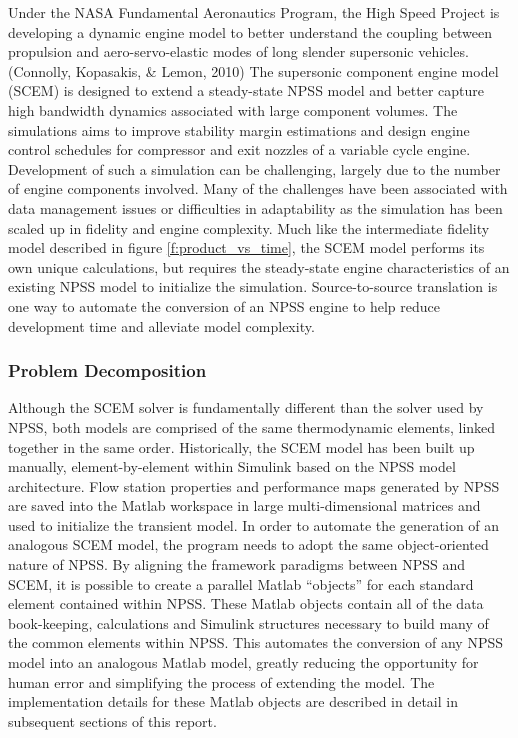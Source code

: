 \documentclass[heading.tex]{subfiles}
\begin{document}
	Under the NASA Fundamental Aeronautics Program, the High Speed Project is developing a dynamic engine model
to better understand the coupling between propulsion and  aero-servo-elastic modes of long slender
supersonic vehicles. (Connolly, Kopasakis, \& Lemon, 2010) The supersonic component engine model (SCEM) is 
designed to extend a steady-state NPSS model and better capture high bandwidth dynamics associated with large
component volumes. The simulations aims to improve stability margin estimations and design engine control schedules
for compressor and exit nozzles of a variable cycle engine. Development of such a simulation can be challenging,
largely due to the number of engine components involved. Many of the challenges have been associated with data
management issues or difficulties in adaptability as the simulation has been scaled up in fidelity and engine complexity. 
Much like the intermediate fidelity model described in figure \ref{f:product_vs_time}, the SCEM model performs its
own unique calculations, but requires the steady-state engine characteristics of an existing NPSS model to initialize
the simulation. Source-to-source translation is one way to automate the conversion of an NPSS engine to help
reduce development time and alleviate model complexity.

\subsubsection{Problem Decomposition}

Although the SCEM solver is fundamentally different than the solver used by NPSS, both models are comprised of 
the same thermodynamic elements, linked together in the same order. Historically, the SCEM model has been
built up manually, element-by-element within Simulink based on the NPSS model architecture. Flow station properties
and performance maps generated by NPSS are saved into the Matlab workspace in large multi-dimensional matrices
and used to initialize the transient model. In order to automate the generation of an analogous SCEM model, the
program needs to adopt the same object-oriented nature of NPSS. By aligning the framework
paradigms between NPSS and SCEM, it is possible to create a parallel Matlab “objects” for each
standard element contained within NPSS. These Matlab objects contain all of the data book-keeping,
calculations and Simulink structures necessary to build many of the common elements within NPSS.
This automates the conversion of any NPSS model into an analogous Matlab model, greatly reducing
the opportunity for human error and simplifying the process of extending the model. The implementation
details for these Matlab objects are described in detail in subsequent sections of this report.	
\end{document}
